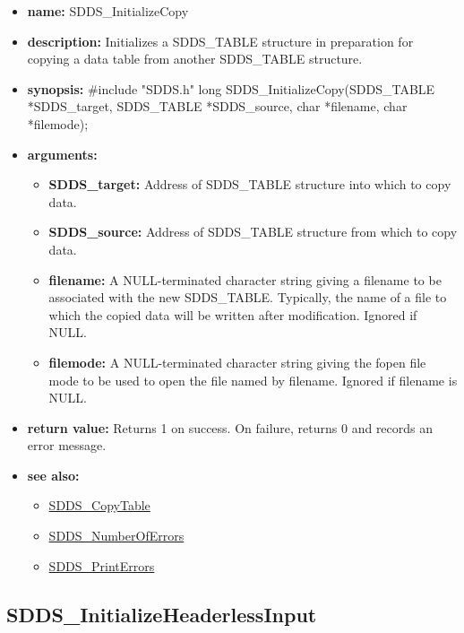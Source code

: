 \documentclass[11pt]{article}
\newcommand{\progref}[1]{\hyperref{SDDS_#1}{{\tt SDDS\_#1} (}{)}{SDDS_#1}}
\begin{document}
\begin{itemize}
\item {\bf name:}\newline
SDDS\_InitializeCopy
\item {\bf description:}\newline
Initializes a SDDS\_TABLE structure in preparation for copying a data table from another SDDS\_TABLE structure.
\item {\bf synopsis:} \#include "SDDS.h"\newline
long SDDS\_InitializeCopy(SDDS\_TABLE *SDDS\_target, SDDS\_TABLE *SDDS\_source, char *filename, char *filemode);
\item {\bf arguments:}
\begin{itemize}
\item {\bf SDDS\_target:} Address of SDDS\_TABLE structure into which to copy data.
\item {\bf SDDS\_source:} Address of SDDS\_TABLE structure from which to copy data.
\item {\bf filename:} A NULL-terminated character string giving a filename to be associated with the new SDDS\_TABLE. Typically, the name of a file to which the copied data will be written after modification. Ignored if NULL.
\item {\bf filemode:} A NULL-terminated character string giving the fopen file mode to be used to open the file named by filename. Ignored if filename is NULL.
\end{itemize}
\item {\bf return value:}\newline
Returns 1 on success. On failure, returns 0 and records an error message.
\item {\bf see also:}
\begin{itemize}
\item \progref{CopyTable}
\item \progref{NumberOfErrors}
\item \progref{PrintErrors}
\end{itemize}
\end{itemize}

\subsection{SDDS\_InitializeHeaderlessInput}
\label{SDDS_InitializeHeaderlessInput}
\end{document}

